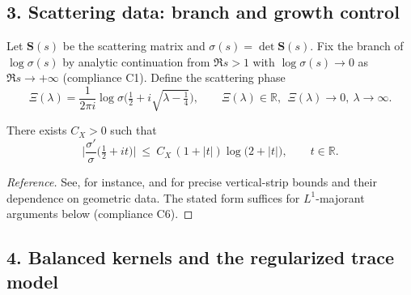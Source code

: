 \subsection*{3. Scattering data: branch and growth control}\relax\hspace{0pt}
\label{subsec:tfc1-scatter} %

\begin{definition}\relax\hspace{0pt}
\label{def:tfc1-branch} %
Let $\mathbf{S}(s)$ be the scattering matrix and $\sigma(s)=\det\mathbf{S}(s)$. Fix the branch of $\log\sigma(s)$ by analytic continuation from $\Re s>1$ with $\log\sigma(s)\to 0$ as $\Re s\to+\infty$ (compliance C1). Define the scattering phase
\[
\Xi(\lambda)=\frac{1}{2\pi i}\log\sigma\!\Big(\tfrac12+i\sqrt{\lambda-\tfrac14}\Big),\qquad \Xi(\lambda)\in\mathbb{R},\ \ \Xi(\lambda)\to0,\ \lambda\to\infty.
\]
\end{definition}

\begin{lemma}\relax\hspace{0pt}
\label{lem:tfc1-growth} %
There exists $C_X>0$ such that
\[
\Big|\frac{\sigma'}{\sigma}\Big(\tfrac12+it\Big)\Big|\ \le\ C_X\, (1+|t|)\log\big(2+|t|\big),\qquad t\in\mathbb{R}.
\]
\end{lemma}

\begin{proof}[Reference]\relax\hspace{0pt}
See, for instance, \cite[Ch.~10]{IwaniecSpectral} and \cite[Thm.~7.2]{Borthwick} for precise vertical-strip bounds and their dependence on geometric data. The stated form suffices for $L^1$-majorant arguments below (compliance C6).\relax\hspace{0pt}
\end{proof}

\subsection*{4. Balanced kernels and the regularized trace model}\relax\hspace{0pt}
\label{subsec:tfc1-regtrace} %

